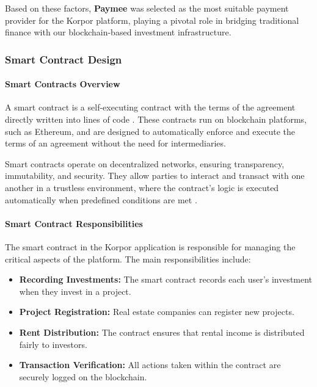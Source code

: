 Based on these factors, \textbf{Paymee} was selected as the most suitable payment provider for the Korpor platform, playing a pivotal role in bridging traditional finance with our blockchain-based investment infrastructure.

\subsubsection{Smart Contract Design}

\paragraph{Smart Contracts Overview}

A smart contract is a self-executing contract with the terms of the agreement directly written into lines of code \cite{Szabo1997SmartContracts}. These contracts run on blockchain platforms, such as Ethereum, and are designed to automatically enforce and execute the terms of an agreement without the need for intermediaries. 

Smart contracts operate on decentralized networks, ensuring transparency, immutability, and security. They allow parties to interact and transact with one another in a trustless environment, where the contract's logic is executed automatically when predefined conditions are met \cite{Wohrer2018SmartContractApplications}.

\paragraph{Smart Contract Responsibilities}

The smart contract in the Korpor application is responsible for managing the critical aspects of the platform. The main responsibilities include:

\begin{itemize}
    \item \textbf{Recording Investments:} The smart contract records each user's investment when they invest in a project.
    \item \textbf{Project Registration:} Real estate companies can register new projects.
    \item \textbf{Rent Distribution:} The contract ensures that rental income is distributed fairly to investors.
    \item \textbf{Transaction Verification:} All actions taken within the contract are securely logged on the blockchain.
\end{itemize}

